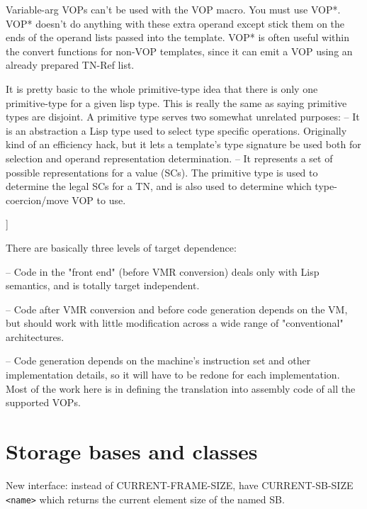     Variable-arg VOPs can't be used with the VOP macro.  You must use VOP*.
    VOP* doesn't do anything with these extra operand except stick them on the
    ends of the operand lists passed into the template.  VOP* is often useful
    within the convert functions for non-VOP templates, since it can emit a VOP
    using an already prepared TN-Ref list.
    

    It is pretty basic to the whole primitive-type idea that there is only one
    primitive-type for a given lisp type.  This is really the same as saying
    primitive types are disjoint.  A primitive type serves two somewhat
    unrelated purposes:
     -- It is an abstraction a Lisp type used to select type specific
        operations.  Originally kind of an efficiency hack, but it lets a
        template's type signature be used both for selection and operand
        representation determination.
     -- It represents a set of possible representations for a value (SCs).  The
        primitive type is used to determine the legal SCs for a TN, and is also
        used to determine which type-coercion/move VOP to use.

]

There are basically three levels of target dependence:

 -- Code in the "front end" (before VMR conversion) deals only with Lisp
    semantics, and is totally target independent.

 -- Code after VMR conversion and before code generation depends on the VM,
    but should work with little modification across a wide range of
    "conventional" architectures.

 -- Code generation depends on the machine's instruction set and other
    implementation details, so it will have to be redone for each
    implementation.  Most of the work here is in defining the translation into
    assembly code of all the supported VOPs.



\chapter{Storage bases and classes}
New interface: instead of CURRENT-FRAME-SIZE, have CURRENT-SB-SIZE \verb+<name>+ which
returns the current element size of the named SB.

